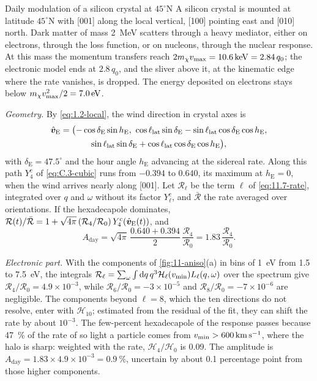 \begin{workedexample}{Daily modulation of a silicon crystal at $45^\circ$N}\label{we:11-daily}
A silicon crystal is mounted at latitude $45^\circ$N with [001] along the local vertical, [100] pointing east and [010] north. Dark matter of mass \SI{2}{MeV} scatters through a heavy mediator, either on electrons, through the loss function, or on nucleons, through the nuclear response. At this mass the momentum transfers reach $2m_{\chi} v_{\mathrm{max}} = \SI{10.6}{keV} = 2.84\,q_0$; the electronic model ends at $2.8\,q_0$, and the sliver above it, at the kinematic edge where the rate vanishes, is dropped. The energy deposited on electrons stays below $m_{\chi} v_{\mathrm{max}}^2/2 = \SI{7.0}{eV}$.

\emph{Geometry.} By \cref{eq:1.2-local}, the wind direction in crystal axes is
\begin{multline*}
  \hat{\bm{v}}_{\mathrm{E}} = \bigl(-\cos\delta_{\mathrm{E}}\sin h_{\mathrm{E}},\ \cos\ell_{\mathrm{lat}}\sin\delta_{\mathrm{E}} - \sin\ell_{\mathrm{lat}}\cos\delta_{\mathrm{E}}\cos h_{\mathrm{E}},\\
  \sin\ell_{\mathrm{lat}}\sin\delta_{\mathrm{E}} + \cos\ell_{\mathrm{lat}}\cos\delta_{\mathrm{E}}\cos h_{\mathrm{E}}\bigr) ,
\end{multline*}
with $\delta_{\mathrm{E}} = 47.5^\circ$ and the hour angle $h_{\mathrm{E}}$ advancing at the sidereal rate. Along this path $Y^{\mathrm{c}}_4$ of \cref{eq:C.3-cubic} runs from $-0.394$ to $0.640$, its maximum at $h_{\mathrm{E}} = 0$, when the wind arrives nearly along [001]. Let $\mathcal{R}_\ell$ be the term $\ell$ of \cref{eq:11.7-rate}, integrated over $q$ and $\omega$ without its factor $Y^{\mathrm{c}}_\ell$, and $\bar{\mathcal{R}}$ the rate averaged over orientations. If the hexadecapole dominates, $\mathcal{R}(t)/\bar{\mathcal{R}} = 1 + \sqrt{4\pi}\,(\mathcal{R}_4/\mathcal{R}_0)\,Y^{\mathrm{c}}_4(\hat{\bm{v}}_{\mathrm{E}}(t))$, and
\begin{equation*}
  A_{\mathrm{day}} = \sqrt{4\pi}\,\frac{0.640 + 0.394}{2}\,\frac{\mathcal{R}_4}{\mathcal{R}_0} = 1.83\,\frac{\mathcal{R}_4}{\mathcal{R}_0} .
\end{equation*}

\emph{Electronic part.} With the components of \cref{fig:11-aniso}(a) in bins of \SI{1}{eV} from 1.5 to \SI{7.5}{eV}, the integrals $\mathcal{R}_\ell = \sum_\omega\int\mathrm{d} q\,q^3\mathcal{H}_\ell(v_{\mathrm{min}})L_\ell(q,\omega)$ over the spectrum give $\mathcal{R}_4/\mathcal{R}_0 = 4.9\times10^{-3}$, while $\mathcal{R}_6/\mathcal{R}_0 = -3\times10^{-5}$ and $\mathcal{R}_8/\mathcal{R}_0 = -7\times10^{-6}$ are negligible. The components beyond $\ell = 8$, which the ten directions do not resolve, enter with $\mathcal{H}_{10}$; estimated from the residual of the fit, they can shift the rate by about $10^{-3}$. The few-percent hexadecapole of the response passes because \SI{47}{\percent} of the rate of so light a particle comes from $v_{\mathrm{min}} > \SI{600}{km.s^{-1}}$, where the halo is sharp: weighted with the rate, $\mathcal{H}_4/\mathcal{H}_0$ is 0.09. The amplitude is $A_{\mathrm{day}} = 1.83\times4.9\times10^{-3} = \SI{0.9}{\percent}$, uncertain by about 0.1 percentage point from those higher components.


\end{workedexample}
